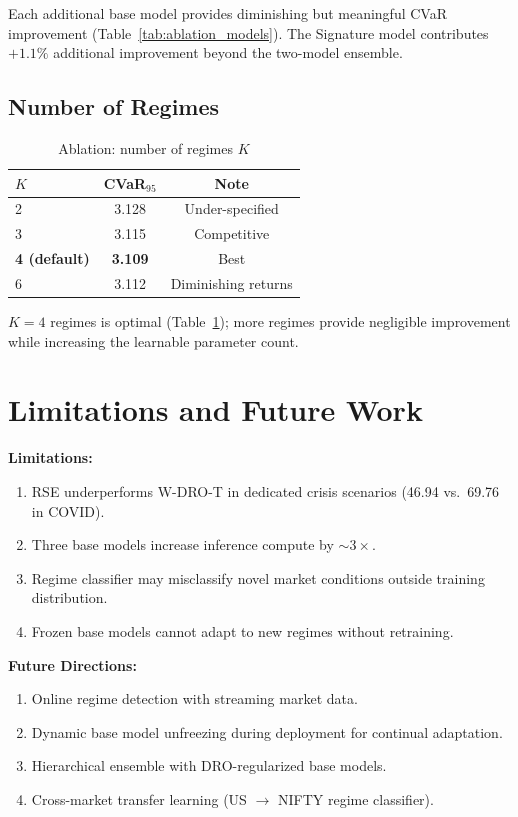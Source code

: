 \documentclass[11pt]{article}
\begin{document}
Each additional base model provides diminishing but meaningful CVaR improvement (Table~\ref{tab:ablation_models}). The Signature model contributes $+1.1\%$ additional improvement beyond the two-model ensemble.

\subsection{Number of Regimes}

\begin{table}[t]
\centering
\caption{Ablation: number of regimes $K$}
\label{tab:ablation_regimes}
\small
\begin{tabular}{lcc}
\toprule
\textbf{$K$} & \textbf{CVaR$_{95}$} & \textbf{Note} \\
\midrule
2 & 3.128 & Under-specified \\
3 & 3.115 & Competitive \\
\textbf{4 (default)} & \textbf{3.109} & Best \\
6 & 3.112 & Diminishing returns \\
\bottomrule
\end{tabular}
\end{table}

$K = 4$ regimes is optimal (Table~\ref{tab:ablation_regimes}); more regimes provide negligible improvement while increasing the learnable parameter count.

\section{Limitations and Future Work}

\textbf{Limitations:}
\begin{enumerate}[noitemsep,leftmargin=*]
    \item RSE underperforms W-DRO-T in dedicated crisis scenarios (46.94 vs.\ 69.76 in COVID).
    \item Three base models increase inference compute by $\sim$$3\times$.
    \item Regime classifier may misclassify novel market conditions outside training distribution.
    \item Frozen base models cannot adapt to new regimes without retraining.
\end{enumerate}

\textbf{Future Directions:}
\begin{enumerate}[noitemsep,leftmargin=*]
    \item Online regime detection with streaming market data.
    \item Dynamic base model unfreezing during deployment for continual adaptation.
    \item Hierarchical ensemble with DRO-regularized base models.
    \item Cross-market transfer learning (US $\to$ NIFTY regime classifier).
\end{enumerate}
\end{document}
